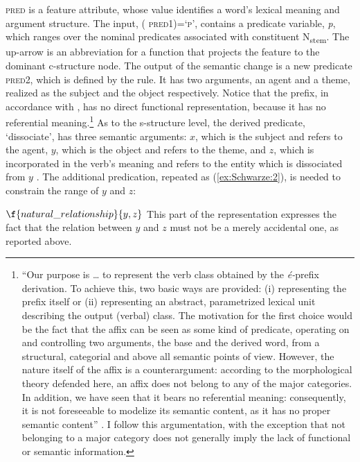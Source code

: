 \documentclass[output=paper]{langsci/langscibook}
\begin{document}
\textsc{pred} is a feature attribute, whose value identifies a word's lexical meaning and argument structure. The input, \textsc{(\textuparrow{} \textsc{pred}1)=`p'},
contains a predicate variable, \emph{p}, which ranges over the nominal predicates associated with constituent N\textsubscript{stem}. The up-arrow is an abbreviation for a function that projects the feature to the dominant c-structure node. The output of the semantic change is a new predicate \textsc{pred}2, which is defined by the rule. It has two arguments,
an agent and a theme, realized as the subject and the object respectively. Notice that the prefix, in accordance with %
%
\citet{NamerJacquey2003}%
%
, has no direct functional representation, because it has no referential meaning.\footnote{\enquote{Our purpose is \ldots{} to represent the verb class obtained by the \emph{é-}prefix derivation. To achieve this, two basic ways are provided: (i) representing the prefix itself or (ii) representing an abstract, parametrized lexical unit describing the output (verbal) class. The motivation for the first choice would be the fact that the affix can be seen as some kind of predicate, operating on and controlling two arguments, the base and the derived word, from a structural, categorial and above all semantic points of view. However, the nature itself of the affix is a counterargument: according to the morphological theory defended here, an affix does not belong to any of the major categories. In addition, we have seen that it bears no referential meaning: consequently, it is not foreseeable to modelize its semantic content, as it has no proper semantic content} %
\citep{NamerJacquey2003}%
. I follow this argumentation, with the exception that not belonging to a major category does not generally imply the lack of functional or semantic information.}
As to the s-structure level, the derived predicate, `dissociate', has three semantic arguments: $x$, which is the subject and refers to the agent, $y$, which is the object and refers to the theme, and $z$, which is incorporated in the verb's meaning and refers to the entity which is dissociated from $y$ . The additional predication, repeated as (\ref{ex:Schwarze:2}), is needed to constrain the range of $y$ and $z$:

\ea\label{ex:Schwarze:2} $\f{natural\_relationship}{y,z}$
\z This part of the representation expresses the fact that the relation between $y$ and $z$ must not be a merely accidental one, as reported above.
\end{document}
